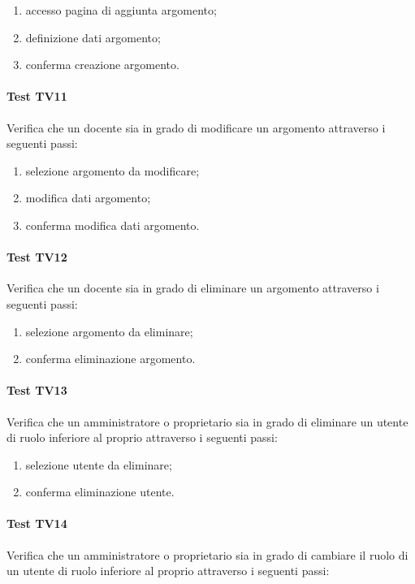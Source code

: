 \documentclass[12pt,a4paper]{article}
\begin{document}
	\begin{enumerate}
		\item accesso pagina di aggiunta argomento;
		\item definizione dati argomento;
		\item conferma creazione argomento.
	\end{enumerate}
	\hypertarget{TV11}{}
	\paragraph{Test TV11}
	Verifica che un docente sia in grado di modificare un argomento attraverso i seguenti passi:
	
	\begin{enumerate}
		\item selezione argomento da modificare;
		\item modifica dati argomento;
		\item conferma modifica dati argomento.
	\end{enumerate}
	\hypertarget{TV12}{}
	\paragraph{Test TV12}
	Verifica che un docente sia in grado di eliminare un argomento attraverso i seguenti passi:
	
	\begin{enumerate}
		\item selezione argomento da eliminare;
		\item conferma eliminazione argomento.
	\end{enumerate}
	\hypertarget{TV13}{}
	\paragraph{Test TV13}
	Verifica che un amministratore o proprietario sia in grado di eliminare un utente di ruolo inferiore al proprio attraverso i seguenti passi:
	
	\begin{enumerate}
		\item selezione utente da eliminare;
		\item conferma eliminazione utente.
	\end{enumerate}
	\hypertarget{TV14}{}
	\paragraph{Test TV14}
	Verifica che un amministratore o proprietario sia in grado di cambiare il ruolo di un utente di ruolo inferiore al proprio attraverso i seguenti passi:
	
\end{document}
